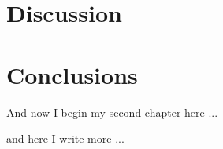 \section{Discussion}
\section{Conclusions}

And now I begin my second chapter here ...

and here I write more ...


